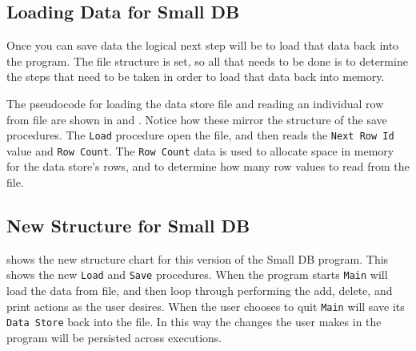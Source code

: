 \subsection{Loading Data for Small DB} %
\label{sub:loading_data_for_small_db}

Once you can save data the logical next step will be to load that data back into the program. The file structure is set, so all that needs to be done is to determine the steps that need to be taken in order to load that data back into memory.

The pseudocode for loading the data store file and reading an individual row from file are shown in  and . Notice how these mirror the structure of the save procedures. The \texttt{Load} procedure open the file, and then reads the \texttt{Next Row Id} value and \texttt{Row Count}. The \texttt{Row Count} data is used to allocate space in memory for the data store's rows, and to determine how many row values to read from the file.




\subsection{New Structure for Small DB} %
\label{sub:new_structure_for_small_db}

 shows the new structure chart for this version of the Small DB program. This shows the new \texttt{Load} and \texttt{Save} procedures. When the program starts \texttt{Main} will load the data from file, and then loop through performing the add, delete, and print actions as the user desires. When the user chooses to quit \texttt{Main} will save its \texttt{Data Store} back into the file. In this way the changes the user makes in the program will be persisted across executions.

